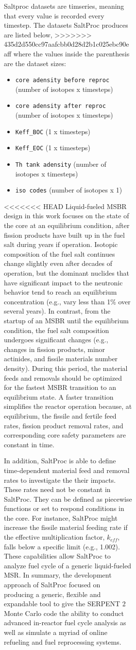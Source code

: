 \begin{figure}[t!]
\begin{figure}[ht!]
\begin{figure}[ht!]
Saltproc datasets are timseries, meaning that every value is recorded every 
timestep. The datasets SaltProc produces are listed below,
>>>>>>> 435d2d550cc97aafcbb0d28d2b1c025ebc90eaff
where the values inside the parenthesis are the dataset sizes:

\begin{itemize}
    \item \texttt{core adensity before reproc} (number of isotopes x timesteps)
    \item \texttt{core adensity after reproc} (number of isotopes x timesteps)
    \item \texttt{Keff\_BOC} (1 x timesteps)
    \item \texttt{Keff\_EOC} (1 x timesteps)
    \item \texttt{Th tank adensity} (number of isotopes x timesteps)
    \item \texttt{iso codes} (number of isotopes x 1)
\end{itemize}

<<<<<<< HEAD
Liquid-fueled \gls{MSBR} design in this work focuses on the state of the core at 
an equilibrium condition, after fission products have built up in the fuel salt 
during years if operation. Isotopic composition of the fuel salt continues 
change slightly even after decades of operation, but the dominant nuclides that 
have significant impact to the neutronic behavior tend to reach an equilibrium 
concentration (e.g., vary less than 1\% over several years). In contrast, from 
the startup of an \gls{MSBR} until the equilibrium condition, the fuel salt 
composition undergoes significant changes (e.g., changes in fission products, 
minor actinides, and fissile materials number density). During this period, the 
material feeds and removals should be optimized for the fastest \gls{MSBR} 
transition to an equilibrium state. A faster transition simplifies the reactor 
operation because, at equilibrium, the fissile and fertile feed rates, fission 
product removal rates, and corresponding core safety parameters are constant in 
time.

In addition, SaltProc is able to define time-dependent material feed and removal 
rates to investigate the their impacts. These rates need not be constant in 
SaltProc. They can be defined as piecewise functions or set to respond 
conditions in the core. For instance, SaltProc might increase the fissile 
material feeding rate if the effective multiplication factor, $k_{eff}$, falls 
below a specific limit (e.g., 1.002).
These capabilities allow SaltProc to analyze fuel cycle of a generic 
liquid-fueled \gls{MSR}. In summary, the development approach of SaltProc 
focused on producing a generic, flexible and expandable tool to give the SERPENT 
2 Monte Carlo code the ability to conduct advanced in-reactor fuel cycle 
analysis as well as simulate a myriad of online refueling and fuel reprocessing 
systems.


\end{figure}
\end{figure}
\end{figure}
